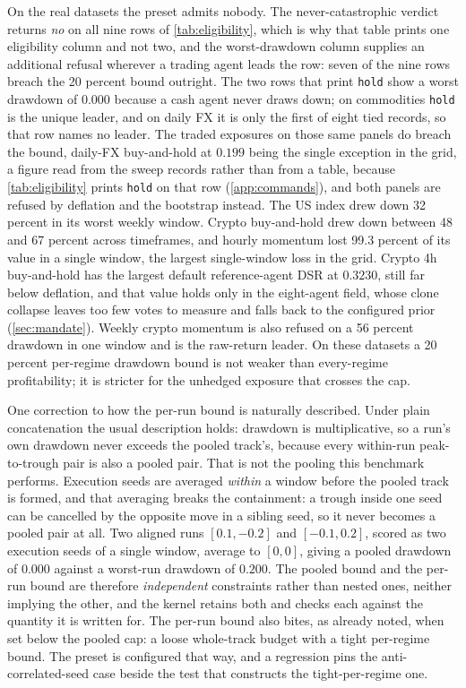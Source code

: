 On the real datasets the preset admits nobody. The never-catastrophic verdict returns \emph{no} on all nine rows of \cref{tab:eligibility}, which is why that table prints one eligibility column and not two, and the worst-drawdown column supplies an additional refusal wherever a trading agent leads the row: seven of the nine rows breach the 20 percent bound outright. The two rows that print \texttt{hold} show a worst drawdown of $0.000$ because a cash agent never draws down; on commodities \texttt{hold} is the unique leader, and on daily FX it is only the first of eight tied records, so that row names no leader. The traded exposures on those same panels do breach the bound, daily-FX buy-and-hold at $0.199$ being the single exception in the grid, a figure read from the sweep records rather than from a table, because \cref{tab:eligibility} prints \texttt{hold} on that row (\cref{app:commands}), and both panels are refused by deflation and the bootstrap instead. The US index drew down 32 percent in its worst weekly window. Crypto buy-and-hold drew down between 48 and 67 percent across timeframes, and hourly momentum lost 99.3 percent of its value in a single window, the largest single-window loss in the grid. Crypto 4h buy-and-hold has the largest default reference-agent DSR at $0.3230$, still far below deflation, and that value holds only in the eight-agent field, whose clone collapse leaves too few votes to measure and falls back to the configured prior (\cref{sec:mandate}). Weekly crypto momentum is also refused on a 56 percent drawdown in one window and is the raw-return leader. On these datasets a 20 percent per-regime drawdown bound is not weaker than every-regime profitability; it is stricter for the unhedged exposure that crosses the cap.

One correction to how the per-run bound is naturally described. Under plain concatenation the usual description holds: drawdown is multiplicative, so a run's own drawdown never exceeds the pooled track's, because every within-run peak-to-trough pair is also a pooled pair. That is not the pooling this benchmark performs. Execution seeds are averaged \emph{within} a window before the pooled track is formed, and that averaging breaks the containment: a trough inside one seed can be cancelled by the opposite move in a sibling seed, so it never becomes a pooled pair at all. Two aligned runs $[0.1, -0.2]$ and $[-0.1, 0.2]$, scored as two execution seeds of a single window, average to $[0, 0]$, giving a pooled drawdown of $0.000$ against a worst-run drawdown of $0.200$. The pooled bound and the per-run bound are therefore \emph{independent} constraints rather than nested ones, neither implying the other, and the kernel retains both and checks each against the quantity it is written for. The per-run bound also bites, as already noted, when set below the pooled cap: a loose whole-track budget with a tight per-regime bound. The preset is configured that way, and a regression pins the anti-correlated-seed case beside the test that constructs the tight-per-regime one.

